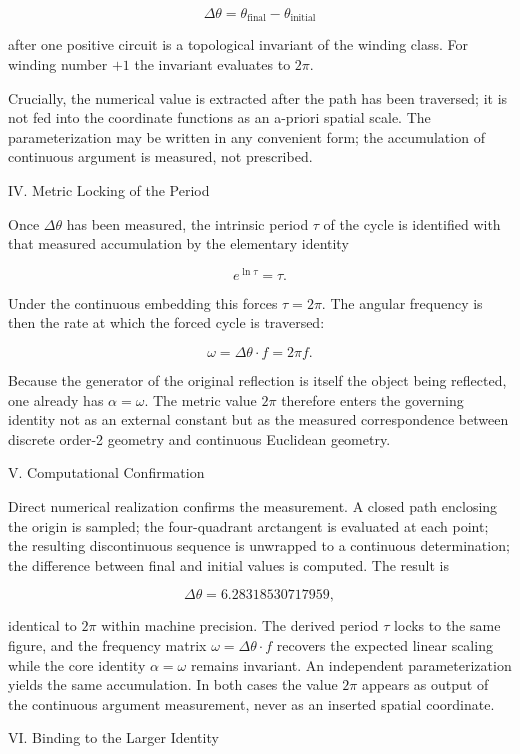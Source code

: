 \[
\Delta\theta=\theta_{\text{final}}-\theta_{\text{initial}}
\]

after one positive circuit is a topological invariant of the winding class. For winding number \(+1\) the invariant evaluates to \(2\pi\).

Crucially, the numerical value is extracted after the path has been traversed; it is not fed into the coordinate functions as an a-priori spatial scale. The parameterization may be written in any convenient form; the accumulation of continuous argument is measured, not prescribed.

IV. Metric Locking of the Period

Once \(\Delta\theta\) has been measured, the intrinsic period \(\tau\) of the cycle is identified with that measured accumulation by the elementary identity  

\[
e^{\ln\tau}=\tau.
\]

Under the continuous embedding this forces \(\tau=2\pi\). The angular frequency is then the rate at which the forced cycle is traversed:  

\[
\omega=\Delta\theta\cdot f=2\pi f.
\]

Because the generator of the original reflection is itself the object being reflected, one already has \(\alpha=\omega\). The metric value \(2\pi\) therefore enters the governing identity not as an external constant but as the measured correspondence between discrete order-2 geometry and continuous Euclidean geometry.

V. Computational Confirmation

Direct numerical realization confirms the measurement. A closed path enclosing the origin is sampled; the four-quadrant arctangent is evaluated at each point; the resulting discontinuous sequence is unwrapped to a continuous determination; the difference between final and initial values is computed. The result is  

\[
\Delta\theta=6.28318530717959,
\]  

identical to \(2\pi\) within machine precision. The derived period \(\tau\) locks to the same figure, and the frequency matrix \(\omega=\Delta\theta\cdot f\) recovers the expected linear scaling while the core identity \(\alpha=\omega\) remains invariant. An independent parameterization yields the same accumulation. In both cases the value \(2\pi\) appears as output of the continuous argument measurement, never as an inserted spatial coordinate.

VI. Binding to the Larger Identity

